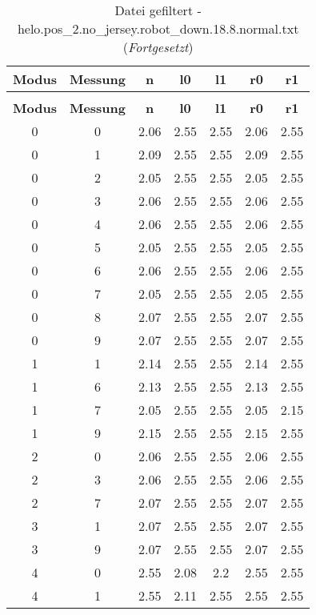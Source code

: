 \begin{longtable}{|c|c||c||c|c||c|c|}
	\caption{Datei gefiltert - helo.pos\_2.no\_jersey.robot\_down.18.8.normal.txt} \label{tab:helo.pos-2.no-jersey.robot-down.18.8.normal.txt} \\ \hline
	\textbf{Modus} & \textbf{Messung} & \textbf{n} & \textbf{l0} & \textbf{l1} & \textbf{r0} & \textbf{r1}\\ \hline
	\endfirsthead
	\caption[]{Datei gefiltert - helo.pos\_2.no\_jersey.robot\_down.18.8.normal.txt (\emph{Fortgesetzt})} \\ \hline
	\textbf{Modus} & \textbf{Messung} & \textbf{n} & \textbf{l0} & \textbf{l1} & \textbf{r0} & \textbf{r1}\\ \hline
	\endhead
	0 & 0 & 2.06 & 2.55 & 2.55 & 2.06 & 2.55 \\ \hline
	0 & 1 & 2.09 & 2.55 & 2.55 & 2.09 & 2.55 \\ \hline
	0 & 2 & 2.05 & 2.55 & 2.55 & 2.05 & 2.55 \\ \hline
	0 & 3 & 2.06 & 2.55 & 2.55 & 2.06 & 2.55 \\ \hline
	0 & 4 & 2.06 & 2.55 & 2.55 & 2.06 & 2.55 \\ \hline
	0 & 5 & 2.05 & 2.55 & 2.55 & 2.05 & 2.55 \\ \hline
	0 & 6 & 2.06 & 2.55 & 2.55 & 2.06 & 2.55 \\ \hline
	0 & 7 & 2.05 & 2.55 & 2.55 & 2.05 & 2.55 \\ \hline
	0 & 8 & 2.07 & 2.55 & 2.55 & 2.07 & 2.55 \\ \hline
	0 & 9 & 2.07 & 2.55 & 2.55 & 2.07 & 2.55 \\ \hline
	1 & 1 & 2.14 & 2.55 & 2.55 & 2.14 & 2.55 \\ \hline
	1 & 6 & 2.13 & 2.55 & 2.55 & 2.13 & 2.55 \\ \hline
	1 & 7 & 2.05 & 2.55 & 2.55 & 2.05 & 2.15 \\ \hline
	1 & 9 & 2.15 & 2.55 & 2.55 & 2.15 & 2.55 \\ \hline
	2 & 0 & 2.06 & 2.55 & 2.55 & 2.06 & 2.55 \\ \hline
	2 & 3 & 2.06 & 2.55 & 2.55 & 2.06 & 2.55 \\ \hline
	2 & 7 & 2.07 & 2.55 & 2.55 & 2.07 & 2.55 \\ \hline
	3 & 1 & 2.07 & 2.55 & 2.55 & 2.07 & 2.55 \\ \hline
	3 & 9 & 2.07 & 2.55 & 2.55 & 2.07 & 2.55 \\ \hline
	4 & 0 & 2.55 & 2.08 & 2.2 & 2.55 & 2.55 \\ \hline
	4 & 1 & 2.55 & 2.11 & 2.55 & 2.55 & 2.55 \\ \hline

\end{longtable}
